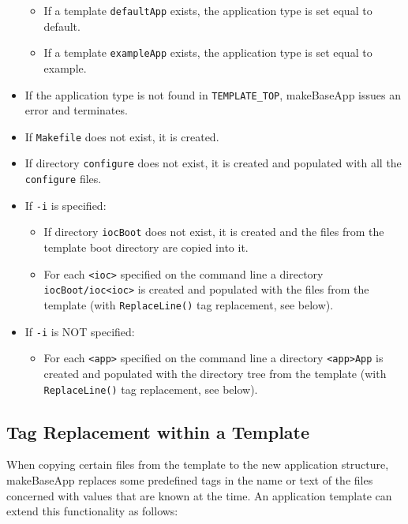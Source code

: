 \begin{itemize}
\begin{itemize}
\item If a template \verb|defaultApp| exists, the application type is set equal to default.

\item If a template \verb|exampleApp| exists, the application type is set equal to example.
\end{itemize}

\item If the application type is not found in \verb|TEMPLATE_TOP|, makeBaseApp issues an error and terminates.

\item If \verb|Makefile| does not exist, it is created.

\item If directory \verb|configure| does not exist, it is created and populated with all the \verb|configure| files.

\item If \verb|-i| is specified:

\begin{itemize}
\item If directory \verb|iocBoot| does not exist, it is created and the files from the template boot directory are copied 
into it.

\item For each \verb|<ioc>| specified on the command line a directory \verb|iocBoot/ioc<ioc>| is created and populated with 
the files from the template (with \verb|ReplaceLine()| tag replacement, see below).
\end{itemize}

\item If \verb|-i| is NOT specified:

\begin{itemize}
\item For each \verb|<app>| specified on the command line a directory \verb|<app>App| is created and populated with the 
directory tree from the template (with \verb|ReplaceLine()| tag replacement, see below).
\end{itemize}
\end{itemize}

\subsection{Tag Replacement within a Template}

When copying certain files from the template to the new application structure, makeBaseApp replaces some predefined 
tags in the name or text of the files concerned with values that are known at the time. An application template can extend 
this functionality as follows:

